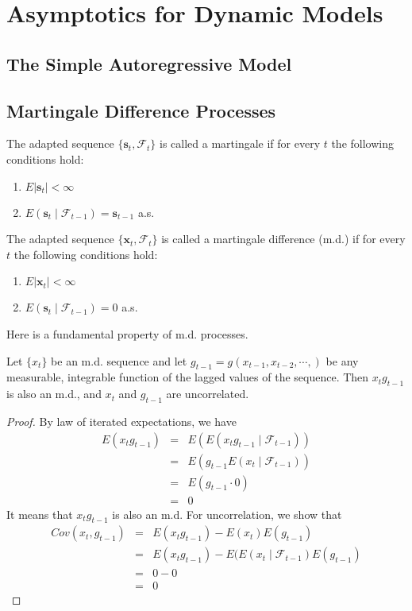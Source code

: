 \section[Asymptotics for Dynamic Models]{Asymptotics for Dynamic Models}
\subsection{The Simple Autoregressive Model}


\subsection{Martingale Difference Processes}
The adapted sequence $\{\bm{s}_{t},\mathcal{F}_{t}\}$ is called a martingale if for every $t$ the following conditions hold:
\begin{enumerate}
\item $E|\bm{s}_{t}|<\infty$
\item $E(\bm{s}_{t}\mid\mathcal{F}_{t-1})=\bm{s}_{t-1}$ a.s.
\end{enumerate}

The adapted sequence $\{\bm{x}_{t},\mathcal{F}_{t}\}$ is called a martingale difference (m.d.) if for every $t$ the following conditions hold:
\begin{enumerate}
\item $E|\bm{x}_{t}|<\infty$
\item $E(\bm{s}_{t}\mid\mathcal{F}_{t-1})=0$ a.s.
\end{enumerate}

Here is a fundamental property of m.d. processes.
\begin{theorem}
Let $\{x_{t}\}$ be an m.d. sequence and let $g_{t-1}=g(x_{t-1},x_{t-2},\cdots,)$ be any measurable, integrable function of the lagged values of the sequence. Then $x_{t}g_{t-1}$ is also an m.d., and $x_{t}$ and $g_{t-1}$ are uncorrelated.
\end{theorem}
\begin{proof}
By law of iterated expectations, we have
\begin{eqnarray*}
E(x_{t}g_{t-1})&=&E(E(x_{t}g_{t-1}\mid\mathcal{F}_{t-1}))\\
			&=&E(g_{t-1}E(x_{t}\mid\mathcal{F}_{t-1}))\\
			&=&E(g_{t-1}\cdot 0)\\
			&=&0
\end{eqnarray*}
It means that $x_{t}g_{t-1}$ is also an m.d. For uncorrelation, we show that
\begin{eqnarray*}
Cov(x_{t},g_{t-1})&=&E(x_{t}g_{t-1})-E(x_{t})E(g_{t-1})\\
			   &=&E(x_{t}g_{t-1})-E(E(x_{t}\mid\mathcal{F}_{t-1})E(g_{t-1})\\
			  &=&0-0\\
			&=&0
\end{eqnarray*}
\end{proof}

